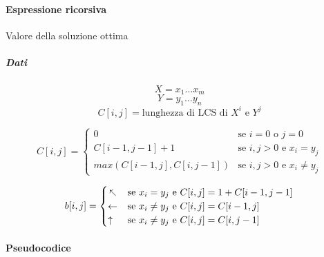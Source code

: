\paragraph{Espressione ricorsiva} Valore della soluzione ottima

\subparagraph{Dati} $$X = x_1 \ldots x_m$$
$$Y = y_1 \ldots y_n$$
$$C[i,j] = \text{lunghezza di LCS di $X^i$ e $Y^j$}$$

\[ C[i,j] =
    \begin{cases}
        0 & \text{se } i = 0 \text{ o } j = 0 \\
        C[i-1, j-1]+1 & \text{se } i,j > 0 \text{ e } x_i = y_j \\
        max(C[i-1,j], C[i,j-1]) & \text{se } i,j > 0 \text{ e } x_i \neq y_j
    \end{cases}
\]

\[ b[i,j] =
    \begin{cases}
        \arrow{3} & \text{se } x_i = y_j \text{ e } C[i,j] = 1+C[i-1,j-1] \\
        \leftarrow & \text{se } x_i \neq y_j \text{ e } C[i,j] = C[i-1,j] \\
        \uparrow & \text{se } x_i \neq y_j \text{ e } C[i,j] = C[i,j-1]
    \end{cases}
\]

\paragraph{Pseudocodice}



